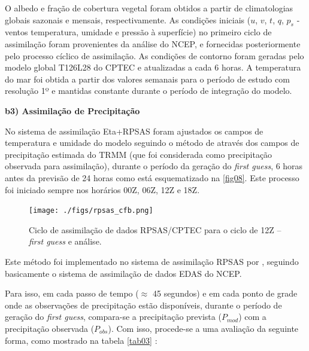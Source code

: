 O albedo e fração de cobertura vegetal foram obtidos a partir de climatologias globais sazonais e mensais, respectivamente. As condições iniciais ($u$, $v$, $t$, $q$, $p_{s}$ - ventos temperatura, umidade e pressão à superfície) no primeiro ciclo de assimilação foram provenientes da análise do NCEP, e fornecidas posteriormente pelo processo cíclico de assimilação.  As condições de contorno foram geradas pelo modelo global T126L28 do CPTEC e atualizadas a cada 6 horas. A temperatura do mar foi obtida a partir dos valores semanais para o período de estudo com resolução 1º e mantidas constante durante o período de integração do modelo.

\textbf{b3) Assimilação de Precipitação}

No sistema de assimilação Eta+RPSAS foram ajustados os campos de temperatura e umidade do modelo seguindo o método de  através dos campos de precipitação estimada do TRMM (que foi considerada como precipitação observada para assimilação), durante o período da geração do \textit{first guess}, 6 horas antes da previsão de 24 horas como está esquematizado na \autoref{fig08}. Este processo foi iniciado sempre nos horários 00Z, 06Z, 12Z e 18Z.

\begin{figure}[!h]
\centering
\texttt{[image: ./figs/rpsas\_cfb.png]}
\caption{Ciclo de assimilação de dados RPSAS/CPTEC para o ciclo de 12Z – \textit{first guess} e análise.}
\label{fig08}
\end{figure}

Este método foi implementado no sistema de assimilação RPSAS por , seguindo basicamente o sistema de assimilação de dados EDAS do NCEP.

Para isso, em cada passo de tempo ($\approx$ 45 segundos) e em cada ponto de grade onde as observações de precipitação estão disponíveis, durante o período de geração do \textit{first guess}, compara-se a precipitação prevista ($P_{mod}$) com a precipitação observada ($P_{obs}$). Com isso, procede-se a uma avaliação da seguinte forma, como mostrado na tabela \autoref{tab03} \cite{linetal01}:

